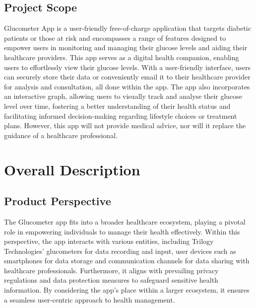 \documentclass[a4paper]{scrreprt}
\begin{document}
\section{Project Scope}
Glucometer App is a user-friendly free-of-charge application that targets diabetic patients or those at risk and encompasses a range of features designed to empower users in monitoring and managing their glucose levels and aiding their healthcare providers.
\newline
This app serves as a digital health companion, enabling users to effortlessly view their glucose levels. With a user-friendly interface, users can securely store their data or conveniently email it to their healthcare provider for analysis and consultation, all done within the app. The app also incorporates an interactive graph, allowing users to visually track and analyse their glucose level over time, fostering a better understanding of their health status and facilitating informed decision-making regarding lifestyle choices or treatment plans.
\newline
However, this app will not provide medical advice, nor will it replace the guidance of a healthcare professional.
\newline


\chapter{Overall Description}

\section{Product Perspective}
The Glucometer app fits into a broader healthcare ecosystem, playing a pivotal role in empowering individuals to manage their health effectively. Within this perspective, the app interacts with various entities, including Trilogy Technologies’ glucometers for data recording and input, user devices such as smartphones for data storage and communication channels for data sharing with healthcare professionals.
\newline
Furthermore, it aligns with prevailing privacy regulations and data protection measures to safeguard sensitive health information. By considering the app’s place within a larger ecosystem, it ensures a seamless user-centric approach to health management.
\end{document}
